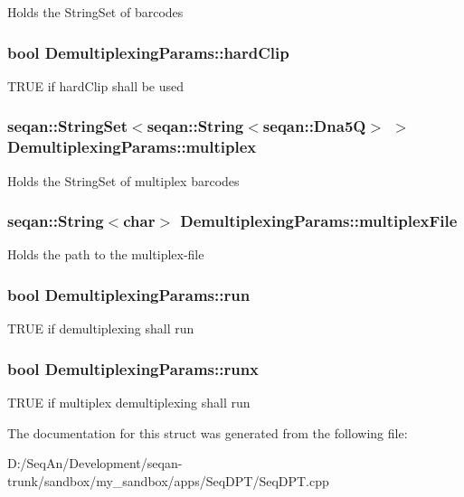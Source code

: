 Holds the String\-Set of barcodes \hypertarget{struct_demultiplexing_params_a28920791fd2dfa590dade23f2924b93a}{
\subsubsection[{hard\-Clip}]{\setlength{\rightskip}{0pt plus 5cm}bool Demultiplexing\-Params\-::hard\-Clip}}\label{struct_demultiplexing_params_a28920791fd2dfa590dade23f2924b93a}
T\-R\-U\-E if hard\-Clip shall be used \hypertarget{struct_demultiplexing_params_a6d5a685bccab390519e4b423018443f7}{
\subsubsection[{multiplex}]{\setlength{\rightskip}{0pt plus 5cm}seqan\-::\-String\-Set$<$seqan\-::\-String$<$seqan\-::\-Dna5\-Q$>$ $>$ Demultiplexing\-Params\-::multiplex}}\label{struct_demultiplexing_params_a6d5a685bccab390519e4b423018443f7}
Holds the String\-Set of multiplex barcodes \hypertarget{struct_demultiplexing_params_a93d9e02c35225dac383b7c52f7b539f7}{
\subsubsection[{multiplex\-File}]{\setlength{\rightskip}{0pt plus 5cm}seqan\-::\-String$<$char$>$ Demultiplexing\-Params\-::multiplex\-File}}\label{struct_demultiplexing_params_a93d9e02c35225dac383b7c52f7b539f7}
Holds the path to the multiplex-\/file \hypertarget{struct_demultiplexing_params_a4a52e0b0dbbacf3e1d4e2b115f3d8cf7}{
\subsubsection[{run}]{\setlength{\rightskip}{0pt plus 5cm}bool Demultiplexing\-Params\-::run}}\label{struct_demultiplexing_params_a4a52e0b0dbbacf3e1d4e2b115f3d8cf7}
T\-R\-U\-E if demultiplexing shall run \hypertarget{struct_demultiplexing_params_aa7bf93a371b34c9ad7ae0a5dc8edc8c5}{
\subsubsection[{runx}]{\setlength{\rightskip}{0pt plus 5cm}bool Demultiplexing\-Params\-::runx}}\label{struct_demultiplexing_params_aa7bf93a371b34c9ad7ae0a5dc8edc8c5}
T\-R\-U\-E if multiplex demultiplexing shall run 

The documentation for this struct was generated from the following file\-:\begin{DoxyCompactItemize}
\item 
D\-:/\-Seq\-An/\-Development/seqan-\/trunk/sandbox/my\-\_\-sandbox/apps/\-Seq\-D\-P\-T/Seq\-D\-P\-T.\-cpp\end{DoxyCompactItemize}
